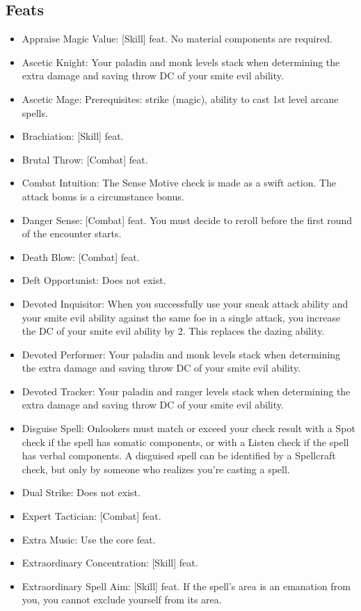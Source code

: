 \subsection{Feats}
\begin{itemize}
\item Appraise Magic Value: [Skill] feat. No material components are required.
\item Ascetic Knight: Your paladin and monk levels stack when determining the extra damage and saving throw DC of your smite evil ability.
\item Ascetic Mage: Prerequisites: \Ki strike (magic), ability to cast 1st level arcane spells.
\item Brachiation: [Skill] feat.
\item Brutal Throw: [Combat] feat.
\item Combat Intuition: The Sense Motive check is made as a swift action. The attack bonus is a circumstance bonus.
\item Danger Sense: [Combat] feat. You must decide to reroll before the first round of the encounter starts.
\item Death Blow: [Combat] feat.
\item Deft Opportunist: Does not exist.
\item Devoted Inquisitor: When you successfully use your sneak attack ability and your smite evil ability against the same foe in a single attack, you increase the DC of your smite evil ability by 2. This replaces the dazing ability.
\item Devoted Performer: Your paladin and monk levels stack when determining the extra damage and saving throw DC of your smite evil ability.
\item Devoted Tracker: Your paladin and ranger levels stack when determining the extra damage and saving throw DC of your smite evil ability.
\item Disguise Spell: Onlookers must match or exceed your check result with a Spot check if the spell has somatic components, or with a Listen check if the spell has verbal components. A disguised spell can be identified by a Spellcraft check, but only by someone who realizes you're casting a spell.
\item Dual Strike: Does not exist.
\item Expert Tactician: [Combat] feat.
\item Extra Music: Use the core feat.
\item Extraordinary Concentration: [Skill] feat.
\item Extraordinary Spell Aim: [Skill] feat. If the spell's area is an emanation from you, you cannot exclude yourself from its area.

\end{itemize}
